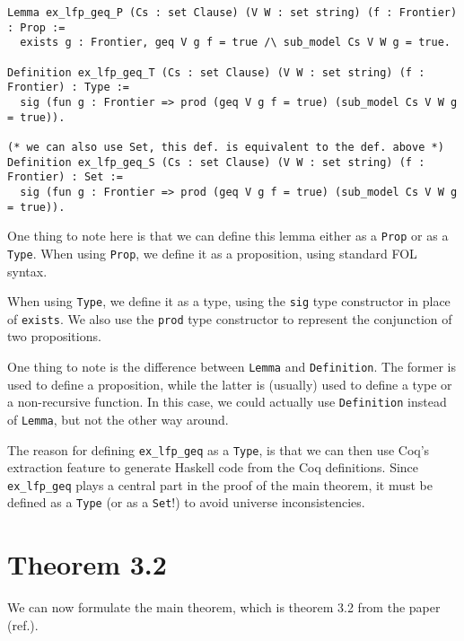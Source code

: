 \begin{minipage}{\linewidth}
\begin{lstlisting}[language=Coq, label={lst:ex_lfp_geq_def}, caption={Multiple defs. of \lstinline{ex_lfp_geq}}]
Lemma ex_lfp_geq_P (Cs : set Clause) (V W : set string) (f : Frontier) : Prop :=
  exists g : Frontier, geq V g f = true /\ sub_model Cs V W g = true.

Definition ex_lfp_geq_T (Cs : set Clause) (V W : set string) (f : Frontier) : Type :=
  sig (fun g : Frontier => prod (geq V g f = true) (sub_model Cs V W g = true)).

(* we can also use Set, this def. is equivalent to the def. above *)
Definition ex_lfp_geq_S (Cs : set Clause) (V W : set string) (f : Frontier) : Set :=
  sig (fun g : Frontier => prod (geq V g f = true) (sub_model Cs V W g = true)).
\end{lstlisting}
\end{minipage}

One thing to note here is that we can define this lemma either as a \lstinline{Prop} or as a \lstinline{Type}.
When using \lstinline{Prop}, we define it as a proposition, using standard FOL syntax.

When using \lstinline{Type}, we define it as a type,
using the \lstinline{sig} type constructor in place of \lstinline{exists}.
We also use the \lstinline{prod} type constructor to represent the conjunction of two propositions.

One thing to note is the difference between \lstinline{Lemma} and \lstinline{Definition}.
The former is used to define a proposition, while the latter is (usually) used to define a type or a non-recursive function.
In this case, we could actually use \lstinline{Definition} instead of \lstinline{Lemma},
but not the other way around.

The reason for defining \lstinline{ex_lfp_geq} as a \lstinline{Type}, is that we can then use
Coq's extraction feature to generate Haskell code from the Coq definitions.
Since \lstinline{ex_lfp_geq} plays a central part in the proof of the main theorem,
it must be defined as a \lstinline{Type} (or as a \lstinline{Set}!) to avoid universe inconsistencies.

\section{Theorem 3.2}

We can now formulate the main theorem, which is theorem 3.2 from the paper (ref.).


